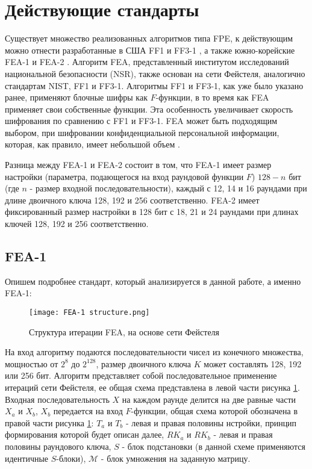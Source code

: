 \documentclass[utf8x, 14pt]{G7-32} %
\begin{document}
\section{Действующие стандарты} %
Существует множество реализованных алгоритмов типа FPE, к действующим можно отнести разработанные в США FF1 и FF3-1 \cite{FF13-1}, а также южно-корейские FEA-1 и FEA-2 \cite{FEA}.
Алгоритм FEA, представленный институтом исследований национальной безопасности (NSR), также основан на сети Фейстеля, аналогично стандартам NIST, FF1 и FF3-1. Алгоритмы FF1 и FF3-1, как уже было указано ранее, применяют блочные шифры как $F$-функции, в то время как FEA применяет свои собственные функции. Эта особенность увеличивает скорость шифрования по сравнению с FF1 и FF3-1. FEA может быть подходящим выбором, при шифровании конфиденциальной персональной информации, которая, как правило, имеет небольшой объем \cite{FEA}.


Разница между FEA-1 и FEA-2 состоит в том, что FEA-1 имеет размер настройки (параметра, подающегося на вход раундовой функции $F$) $128-n$ бит (где $n$ - размер входной последовательности), каждый с 12, 14 и 16 раундами при длине двоичного ключа 128, 192 и 256 соответственно. FEA-2 имеет фиксированный размер настройки в 128 бит с 18, 21 и 24 раундами при длинах ключей 128, 192 и 256 соответственно.

\subsection{FEA-1}
Опишем подробнее стандарт, который анализируется в данной работе, а именно FEA-1:

\begin{figure}[h!]
	\texttt{[image: FEA-1 structure.png]}
	\caption{Структура итерации FEA, на основе сети Фейстеля}
	\label{fig:fea_structure}
\end{figure}

На вход алгоритму подаются последовательности чисел из конечного множества, мощностью от $2^8$ до $2^{128}$, размер двоичного ключа $K$ может составлять 128, 192 или 256 бит. Алгоритм представляет собой последовательное применение итераций сети Фейстеля, ее общая схема представлена в левой части рисунка \ref{fig:fea_structure}. Входная последовательность $X$ на каждом раунде делится на две равные части $X_a$ и $ X_b$, $X_b$ передается на вход $F$-функции, общая схема которой обозначена в правой части рисунка \ref{fig:fea_structure}: $T_a$ и $T_b$ - левая и правая половины нстройки, принцип формирования которой будет описан далее, $RK_a$ и $RK_b$ - левая и правая половины раундового ключа, $S$ - блок подстановки (в данной схеме применяются идентичные $S$-блоки), $\mathcal{M}$ - блок умножения на заданную матрицу.
\end{document}
